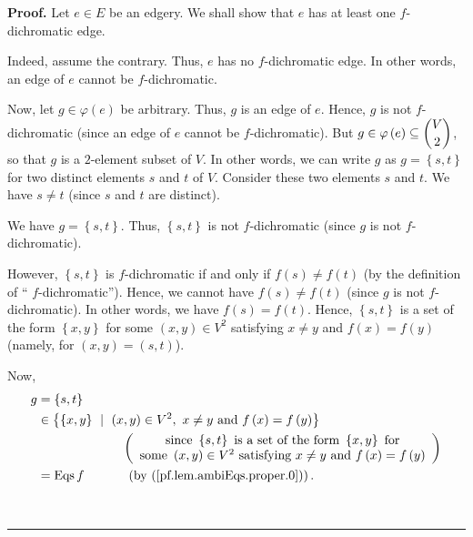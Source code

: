 \documentclass[numbers=enddot,12pt,final,onecolumn,notitlepage]{scrartcl}%
\theoremstyle{definition}
\newenvironment{proof}[1][Proof]{\noindent\textbf{#1.} }{\ \rule{0.5em}{0.5em}}
\newenvironment{verlong}{}{}
\begin{document}
\begin{verlong}
\begin{proof}
Let $e\in E$ be an edgery. We shall show that $e$ has at least one
$f$-dichromatic edge.

Indeed, assume the contrary. Thus, $e$ has no $f$-dichromatic edge. In other
words, an edge of $e$ cannot be $f$-dichromatic.

Now, let $g\in\varphi\left(  e\right)  $ be arbitrary. Thus, $g$ is an edge of
$e$. Hence, $g$ is not $f$-dichromatic (since an edge of $e$ cannot be
$f$-dichromatic). But $g\in\varphi\left(  e\right)  \subseteq\dbinom{V}{2}$,
so that $g$ is a $2$-element subset of $V$. In other words, we can write $g$
as $g=\left\{  s,t\right\}  $ for two distinct elements $s$ and $t$ of $V$.
Consider these two elements $s$ and $t$. We have $s\neq t$ (since $s$ and $t$
are distinct).

We have $g=\left\{  s,t\right\}  $. Thus, $\left\{  s,t\right\}  $ is not
$f$-dichromatic (since $g$ is not $f$-dichromatic).

However, $\left\{  s,t\right\}  $ is $f$-dichromatic if and only if $f\left(
s\right)  \neq f\left(  t\right)  $ (by the definition of \textquotedblleft%
$f$-dichromatic\textquotedblright). Hence, we cannot have $f\left(  s\right)
\neq f\left(  t\right)  $ (since $g$ is not $f$-dichromatic). In other words,
we have $f\left(  s\right)  =f\left(  t\right)  $. Hence, $\left\{
s,t\right\}  $ is a set of the form $\left\{  x,y\right\}  $ for some $\left(
x,y\right)  \in V^{2}$ satisfying $x\neq y$ and $f\left(  x\right)  =f\left(
y\right)  $ (namely, for $\left(  x,y\right)  =\left(  s,t\right)  $).

Now,%
\begin{align*}
g  &  =\left\{  s,t\right\} \\
&  \in\left\{  \left\{  x,y\right\}  \ \mid\ \left(  x,y\right)  \in
V^{2},\ x\neq y\text{ and }f\left(  x\right)  =f\left(  y\right)  \right\} \\
&  \ \ \ \ \ \ \ \ \ \ \ \ \ \ \ \ \ \ \ \ \left(
\begin{array}
[c]{c}%
\text{since }\left\{  s,t\right\}  \text{ is a set of the form }\left\{
x,y\right\}  \text{ for}\\
\text{some }\left(  x,y\right)  \in V^{2}\text{ satisfying }x\neq y\text{ and
}f\left(  x\right)  =f\left(  y\right)
\end{array}
\right) \\
&  =\operatorname*{Eqs}f\ \ \ \ \ \ \ \ \ \ \left(  \text{by
(\ref{pf.lem.ambiEqs.proper.0})}\right)  .
\end{align*}



\end{proof}
\end{verlong}
\end{document}
